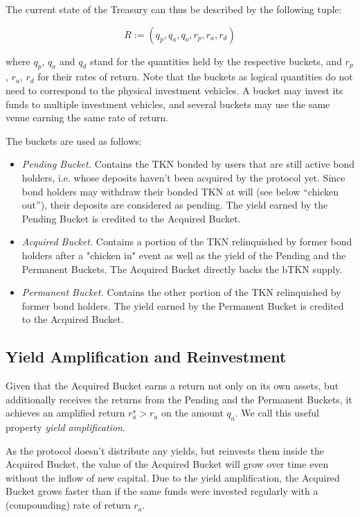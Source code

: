 \documentclass{article}
\begin{document}
The current state of the Treasury can thus be described by the following tuple:

$$R:=(q_p, q_a, q_o, r_p, r_a, r_d)$$

where $q_p$, $q_a$ and $q_d$ stand for the quantities held by the respective buckets, and $r_p$, $r_a$, $r_d$ for their rates of return. Note that the buckets as logical quantities do not need to correspond to the physical investment vehicles. A bucket may invest its funds to multiple investment vehicles, and several buckets may use the same venue earning the same rate of return.

The buckets are used as follows:
\begin{itemize}
    \item \textit{Pending Bucket.} Contains the TKN bonded by users that are still active bond holders, i.e. whose deposits haven’t been acquired by the protocol yet.  Since bond holders may withdraw their bonded TKN at will (see below “chicken out”), their deposits are considered as pending. The yield earned by the Pending Bucket is credited to the Acquired Bucket.
    \item \textit{Acquired Bucket.} Contains a portion of the TKN relinquished by former bond holders after a "chicken in" event as well as the yield of the Pending and the Permanent Buckets. The Acquired Bucket directly backs the bTKN supply. 
    \item \textit{Permanent Bucket.} Contains the other portion of the TKN relinquished by former bond holders. The yield earned by the Permanent Bucket is credited to the Acquired Bucket.
\end{itemize}

\subsection{Yield Amplification and Reinvestment}
Given that the Acquired Bucket earns a return not only on its own assets, but additionally receives the returns from the Pending and the Permanent Buckets, it achieves an amplified return $r_a^\star > r_a$ on the amount $q_a$. We call this useful property \textit{yield amplification}.

As the protocol doesn't distribute any yields, but reinvests them inside the Acquired Bucket, the value of the Acquired Bucket will grow over time even without the inflow of new capital. Due to the yield amplification, the Acquired Bucket grows faster than if the same funds were invested regularly with a (compounding) rate of return $r_a$.
\end{document}
